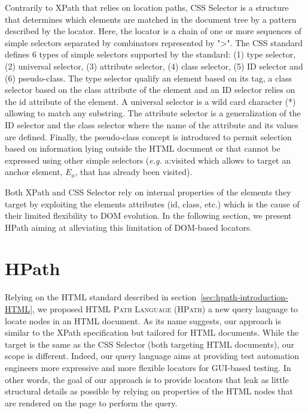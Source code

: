 Contrarily to XPath that relies on location paths, CSS Selector is a structure that determines which elements are matched in the document tree by a pattern described by the locator. Here, the locator is a chain of one or more sequences of simple selectors separated by combinators\cite{W3C2018} represented by ">". The CSS standard defines 6 types of simple selectors supported by the standard: (1) type selector, (2) universal selector, (3) attribute selector, (4) class selector, (5) ID selector and (6) pseudo-class. The type selector qualify an element based on its tag, a class selector based on the class attribute of the element and an ID selector relies on the id attribute of the element. A universal selector is a wild card character (*) allowing to match any substring. The attribute selector is a generalization of the ID selector and the class selector where the name of the attribute and its values are defined. Finally, the pseudo-class concept is introduced to permit selection based on information lying outside the HTML document or that cannot be expressed using other simple selectors (\emph{e.g.} a:visited which allows to target an anchor element, $E_a$, that has already been visited).

Both XPath and CSS Selector rely on internal properties of the elements they target by exploiting the elements attributes (id, class, etc.) which is the cause of their limited flexibility to DOM evolution. In the following section, we present HPath aiming at alleviating this limitation of DOM-based locators.

\section{HPath}
\label{sec:hpath-hpath}

Relying on the HTML standard described in section~\ref{sec:hpath-introduction-HTML}, we proposed \textsc{HTML Path Language (HPath)} a new query language to locate nodes in an HTML document. As its name suggests, our approach is similar to the XPath specification but tailored for HTML documents. While the target is the same as the CSS Selector (both targeting HTML documents), our scope is different. Indeed, our query language aims at providing test automation engineers more expressive and more flexible locators for GUI-based testing. In other words, the goal of our approach is to provide locators that leak as little structural details as possible by relying on properties of the HTML nodes that are rendered on the page to perform the query.

